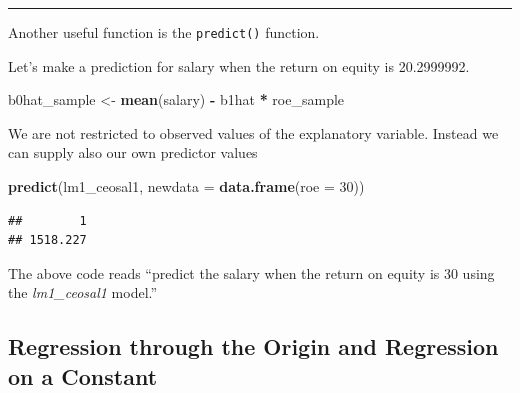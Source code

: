 \documentclass[]{book}
\newenvironment{Shaded}{\begin{snugshade}}{\end{snugshade}}
\newcommand{\DataTypeTok}[1]{\textcolor[rgb]{0.13,0.29,0.53}{#1}}
\newcommand{\DecValTok}[1]{\textcolor[rgb]{0.00,0.00,0.81}{#1}}
\newcommand{\KeywordTok}[1]{\textcolor[rgb]{0.13,0.29,0.53}{\textbf{#1}}}
\newcommand{\NormalTok}[1]{#1}
\newcommand{\OperatorTok}[1]{\textcolor[rgb]{0.81,0.36,0.00}{\textbf{#1}}}
\newcommand{\StringTok}[1]{\textcolor[rgb]{0.31,0.60,0.02}{#1}}
\begin{document}
\begin{center}\rule{0.5\linewidth}{\linethickness}\end{center}

Another useful function is the \texttt{predict()} function.

\begin{Shaded}
\end{Shaded}

Let's make a prediction for salary when the return on equity is
20.2999992.

\begin{Shaded}
\begin{Highlighting}[]
\NormalTok{b0hat_sample <-}\StringTok{ }\KeywordTok{mean}\NormalTok{(salary) }\OperatorTok{-}\StringTok{ }\NormalTok{b1hat }\OperatorTok{*}\StringTok{ }\NormalTok{roe_sample }
\end{Highlighting}
\end{Shaded}

We are not restricted to observed values of the explanatory variable.
Instead we can supply also our own predictor values

\begin{Shaded}
\begin{Highlighting}[]
\KeywordTok{predict}\NormalTok{(lm1_ceosal1, }\DataTypeTok{newdata =} \KeywordTok{data.frame}\NormalTok{(}\DataTypeTok{roe =} \DecValTok{30}\NormalTok{))}
\end{Highlighting}
\end{Shaded}

\begin{verbatim}
##        1 
## 1518.227
\end{verbatim}

The above code reads ``predict the salary when the return on equity is
30 using the \emph{lm1\_ceosal1} model.''

\hypertarget{regression-through-the-origin-and-regression-on-a-constant}{%
\subsection{Regression through the Origin and Regression on a
Constant}\label{regression-through-the-origin-and-regression-on-a-constant}}
\end{document}
